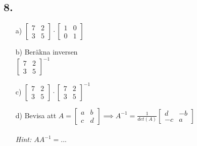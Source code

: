 \documentclass{article}
\begin{document}
\subsection*{8.}
\begin{itemize}
    \item[a) ]	
				$ 
    			\begin{bmatrix}
    			7  & 2 \\
    			3  & 5
    			\end{bmatrix}
    			\cdot
    			\begin{bmatrix}
    			1 & 0  \\
    			0 & 1
    			\end{bmatrix}
    			$
    			
    \item[b) ]	Beräkna inversen 
    			\newline
    			\\
    			$ 
    			\begin{bmatrix}
    			7  & 2 \\
    			3  & 5
    			\end{bmatrix}
				^{-1}
    			$
    			
    \item[c) ]	
    			$ 
    			\begin{bmatrix}
    			7  & 2 \\
    			3  & 5
    			\end{bmatrix}
    			\cdot
    			\begin{bmatrix}
    			7  & 2 \\
    			3  & 5
    			\end{bmatrix}
				^{-1}
    			$
    			
    \item[d) ]	Bevisa att
    			$ 
    			A = 
    			\begin{bmatrix}
    			a  & b \\
    			c  & d
    			\end{bmatrix}  
    			\implies
    			A^{-1} = 
    			\frac{1}{det(A)}
    			\begin{bmatrix}
    			d  & -b \\
    			-c & a
    			\end{bmatrix}		
    			$
    			\\
    			\\
    			\it{Hint: $A A^{-1} = ... $}
\end{itemize}
\end{document}
